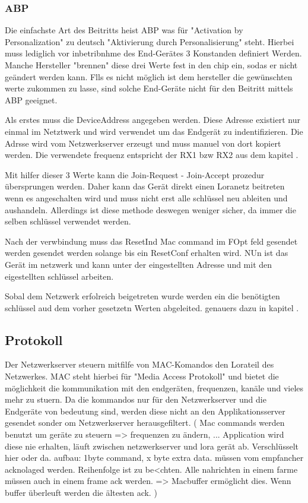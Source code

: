 \documentclass[a4paper,12pt]{article}
\begin{document}
            \subsubsection{ABP}
                Die einfachste Art des Beitritts heist ABP was für "Activation by Personalization" zu deutsch "Aktivierung durch Personalisierung" steht. Hierbei muss lediglich vor inbetribnhme des End-Gerätes 3 Konstanden definiert Werden. Manche Hersteller "brennen" diese 
                drei Werte fest in den chip ein, sodas er nicht geändert werden kann. Flls es nicht möglich ist dem hersteller die gewünschten werte zukommen zu lasse, sind solche End-Geräte nicht für den Beitritt mittels ABP geeignet.
                
                Als erstes muss die DeviceAddress angegeben werden. Diese Adresse existiert nur einmal im Netztwerk und wird verwendet um das Endgerät zu indentifizieren. Die Adrsse wird vom Netzwerkserver erzeugt und muss manuel von dort kopiert werden.  Die verwendete frequenz entspricht der RX1 bzw RX2 aus dem kapitel .

                Mit hilfer dieser 3 Werte kann die Join-Request - Join-Accept prozedur übersprungen werden. Daher kann das Gerät direkt einen Loranetz beitreten wenn es angeschalten wird und muss nicht erst alle schlüssel neu ableiten und aushandeln. Allerdings ist diese methode deswegen weniger sicher, da immer die selben schlüssel verwendet werden.

                Nach der verwbindung muss das ResetInd Mac command im FOpt feld gesendet werden gesendet werden solange bis ein ResetConf erhalten wird. NUn ist das Gerät im netzwerk und kann unter der eingestellten Adresse und mit den eigestellten schlüssel arbeiten.
           
                Sobal dem Netzwerk erfolreich beigetreten wurde werden ein die benötigten schlüssel aud dem vorher gesetzetn Werten abgeleited. genauers dazu in kapitel .
        \subsection{Protokoll}
            Der Netzwerkserver steuern mitfilfe von MAC-Komandos den Lorateil des Netzwerkes. MAC steht hierbei für "Media Access Protokoll" und bietet die möglichkeit die kommunikation mit den endgeräten, frequenzen, kanäle und vieles mehr zu stuern. Da die kommandos nur für den Netzwerkserver und die Endgeräte von bedeutung sind, werden diese nicht an den Applikationsserver gesendet sonder om Netzwerkserver herausgefiltert.
            \cite{LoRaSpec}(
                Mac commands werden benutzt um geräte zu steuern => frequenzen zu ändern, ...
                Application wird diese nie erhalten, läuft zwischen netzwerkserver und lora gerät ab.
                Verschlüsselt hier oder da.
                aufbau: 1byte command, x byte extra data.
                müssen vom empfancher acknolaged werden. Reihenfolge ist zu be<chten. Alle nahrichten in einem farme müssen auch in einem frame ack werden. => Macbuffer ermöglicht dies. Wenn buffer überleuft werden die ältesten ack. 
            )
\end{document}
